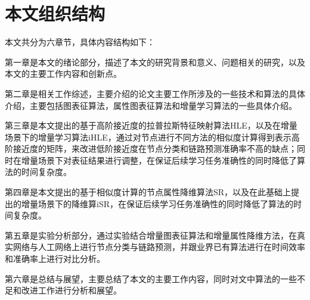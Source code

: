 \section{本文组织结构}

本文共分为六章节，具体内容结构如下：

第一章是本文的绪论部分，描述了本文的研究背景和意义、问题相关的研究，以及本文的主要工作内容和创新点。

第二章是相关工作综述，主要介绍的论文主要工作所涉及的一些技术和算法的具体介绍，主要包括图表征算法，属性图表征算法和增量学习算法的一些具体介绍。

第三章是本文提出的基于高阶接近度的拉普拉斯特征映射算法HLE，以及在增量场景下的增量学习算法iHLE，通过对节点进行不同方法的相似度计算得到表示高阶接近度的矩阵，来改进低阶接近度在节点分类和链路预测准确率不高的缺点；同时在增量场景下对表征结果进行调整，在保证后续学习任务准确性的同时降低了算法的时间复杂度。

第四章是本文提出的基于相似度计算的节点属性降维算法SR，以及在此基础上提出的增量场景下的降维算iSR，在保证后续学习任务准确性的同时降低了算法的时间复杂度。

第五章是实验分析部分，通过实验结合增量图表征算法和增量属性降维方法，在真实网络与人工网络上进行节点分类与链路预测，并跟业界已有算法进行在时间效率和准确率上进行对比分析。

第六章是总结与展望，主要总结了本文的主要工作内容，同时对文中算法的一些不足和改进工作进行分析和展望。
